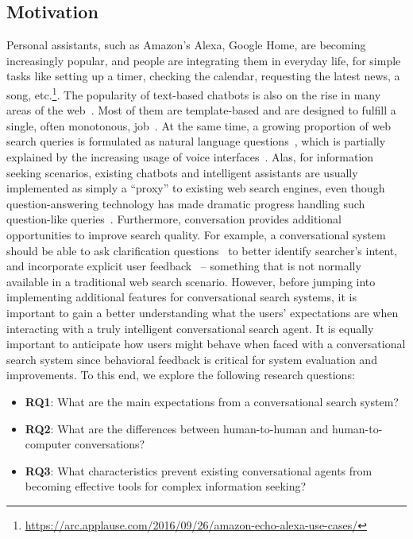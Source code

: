 \subsection{Motivation}
\label{section:conversation:user-study:motivation}

Personal assistants, such as Amazon's Alexa, Google Home, \etc are becoming increasingly popular, and people are integrating them in everyday life, \eg for simple tasks like setting up a timer, checking the calendar, requesting the latest news, a song, etc.\footnote{\href{url}{https://arc.applause.com/2016/09/26/amazon-echo-alexa-use-cases/}}.
The popularity of text-based chatbots is also on the rise in many areas of the web~\cite{ferrara2014rise}.
Most of them are template-based and are designed to fulfill a single, often monotonous, job~\cite{clement2015interacting,edwards2014bot}.
At the same time, a growing proportion of web search queries is formulated as natural language questions~\cite{aula2010does,liu2012web,pang2011search}, which is partially explained by the increasing usage of voice interfaces~\cite{white2015questions}.
Alas, for information seeking scenarios, existing chatbots and intelligent assistants are usually implemented as simply a ``proxy'' to existing web search engines, even though question-answering technology has made dramatic progress handling such question-like queries~\cite{tsai2015web}.
Furthermore, conversation provides additional opportunities to improve search quality. For example, a conversational system should be able to ask clarification questions~\cite{braslavski2017clarq} to better identify searcher's intent, and incorporate explicit user feedback~\cite{radlinski2017} -- something that is not normally available in a traditional web search scenario.
However, before jumping into implementing additional features for conversational search systems, it is important to gain a better understanding what the users' expectations are when interacting with a truly intelligent conversational search agent. It is equally important to anticipate how users might behave when faced with a conversational search system since behavioral feedback is critical for system evaluation and improvements. To this end, we explore the following research questions:

\begin{itemize}[noitemsep]
\item \textbf{RQ1}: What are the main expectations from a conversational search system?
\item \textbf{RQ2}: What are the differences between human-to-human and human-to-computer conversations?
\item \textbf{RQ3}: What characteristics prevent existing conversational agents from becoming effective tools for complex information seeking?
\end{itemize}

